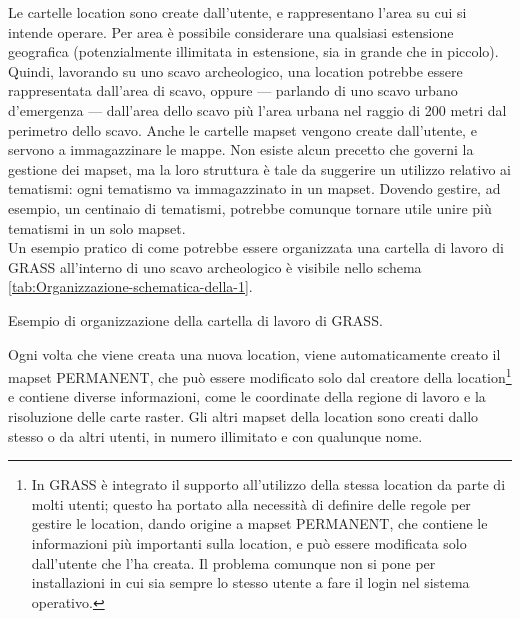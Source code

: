 		Le cartelle \textsf{location} sono create dall'utente, e rappresentano l'area su cui si intende operare. Per area è possibile considerare una qualsiasi estensione geografica (potenzialmente illimitata in estensione, sia in grande che in piccolo). Quindi, lavorando su uno scavo archeologico, una location potrebbe essere rappresentata dall'area di scavo, oppure --- parlando di uno scavo urbano d'emergenza --- dall'area dello scavo più l'area urbana nel raggio di 200 metri dal perimetro dello scavo. Anche le cartelle \textsf{mapset} vengono create dall'utente, e servono a immagazzinare le mappe. Non esiste alcun precetto che governi la gestione dei mapset, ma la loro struttura è tale da suggerire un utilizzo relativo ai tematismi: ogni tematismo va immagazzinato in un mapset. Dovendo gestire, ad esempio, un centinaio di tematismi, potrebbe comunque tornare utile unire più tematismi in un solo mapset.\\
		
		Un esempio pratico di come potrebbe essere organizzata una cartella di lavoro di GRASS all'interno di uno scavo archeologico è visibile nello schema \ref{tab:Organizzazione-schematica-della-1}.
		
		\begin{table}
			\begin{centering}
			\end{centering}
			\caption{{\small \label{tab:Organizzazione-schematica-della-1}Esempio di organizzazione della cartella di lavoro di GRASS.}}
		\end{table}


		Ogni volta che viene creata una nuova location, viene automaticamente creato il mapset PERMANENT, che può essere modificato solo dal creatore della location\footnote{In GRASS è integrato il supporto all'utilizzo della stessa location da parte di molti utenti; questo ha portato alla necessità di definire delle regole per gestire le location, dando origine a mapset PERMANENT, che contiene le informazioni più importanti sulla location, e può essere modificata solo dall'utente che l'ha creata. Il problema comunque non si pone per installazioni in cui sia sempre lo stesso utente a fare il login nel sistema operativo.} e contiene diverse informazioni, come le coordinate della regione di lavoro e la risoluzione delle carte raster. Gli altri mapset della location sono creati dallo stesso o da altri utenti, in numero illimitato e con qualunque nome.

